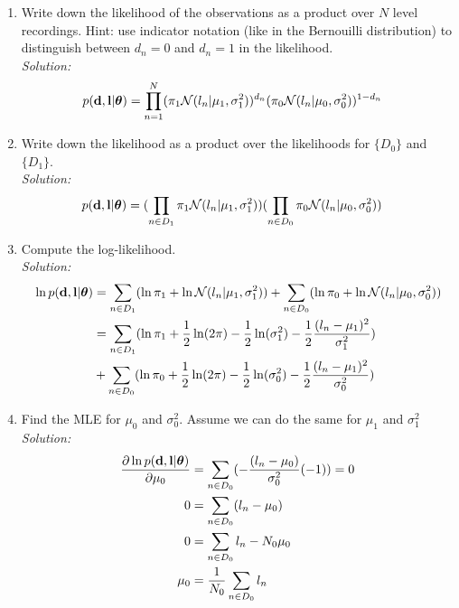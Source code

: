 \documentclass[12pt,a4paper]{article}
\newcommand{\thetavec}{\boldsymbol{\theta}}
\newcommand{\dvec}{{\bf d}}
\newcommand{\lvec}{{\bf l}}
\begin{document}
\begin{enumerate}
  \item Write down the likelihood of the observations as a product over $N$ level recordings.  Hint: use indicator notation (like in the Bernouilli distribution) to distinguish between $d_n=0$ and $d_n=1$ in the likelihood. \\
  \emph{Solution:} \\
	  \begin{align*}
	  	p(\dvec, \lvec | \thetavec) &= \prod_{n = 1}^{N} (\pi_1 \mathcal{N} (l_{n} | \mu_{1}, \sigma_{1}^{2}) )^{d_n} (\pi_0 \mathcal{N} (l_{n} | \mu_{0}, \sigma_{0}^{2})) ^{1 - d_n} 
	  \end{align*}
  
  \item Write down the likelihood as a product over the likelihoods for $\{D_0\}$ and $\{D_1\}$. \\
	  \emph{Solution:} \\
		  \begin{align*}
		  	p(\dvec, \lvec | \thetavec) 
		  	&= ( \prod_{n \in D_1} \pi_{1} \mathcal{N}(l_n | \mu_{1} , \sigma_{1}^{2})) ( \prod_{n \in D_0} \pi_{0} \mathcal{N}(l_n | \mu_{0} , \sigma_{0}^{2}))
		  \end{align*}
  
  \item Compute the log-likelihood. \\
	  \emph{Solution:} \\
		  \begin{align*}
		  	\ln p(\dvec, \lvec | \thetavec) &= \sum_{n \in D_{1}}(\ln \pi_{1} + \ln \mathcal{N}(l_{n} | \mu_{1}, \sigma_{1}^{2}) ) + \sum_{n \in D_{0}} (\ln \pi_{0} + \ln \mathcal{N}(l_{n} | \mu_{0}, \sigma_{0}^{2})) \\
		  	&= \sum_{n \in D_{1}}(\ln \pi_{1} + \frac{1}{2} \ln (2 \pi) - \frac{1}{2} \ln (\sigma_{1}^{2}) - \frac{1}{2} \frac{(l_{n} - \mu_{1})^{2}}{\sigma_{1}^{2}}) \\
		  	&+ \sum_{n \in D_{0}}  (\ln \pi_{0} + \frac{1}{2} \ln (2 \pi) - \frac{1}{2} \ln (\sigma_{0}^{2}) - \frac{1}{2} \frac{(l_{n} - \mu_{1})^{2}}{\sigma_{0}^{2}})
		  \end{align*}
  
  \item Find the MLE for $\mu_0$ and $\sigma_0^2$.  Assume we can do the same for $\mu_1$ and $\sigma_1^2$ \\
	  \emph{Solution:} \\
		  \begin{align*}
		  	\frac{\partial \ln p(\dvec, \lvec | \thetavec)}{\partial \mu_{0}} &= \sum_{n \in D_{0}} (- \frac{(l_{n} - \mu_{0})}{\sigma_{0}^{2}} (-1)) = 0 \\
		  	0 &= \sum_{n \in D_{0}} (l_{n} - \mu_{0}) \\
		  	0 &= \sum_{n \in D_{0}} l_{n} - N_{0} \mu_{0} \\
		  	\mu_{0} &= \frac{1}{N_{0}} \sum_{n \in D_{0}} l_{n}
		  \end{align*}
		  

\end{enumerate}
\end{document}

